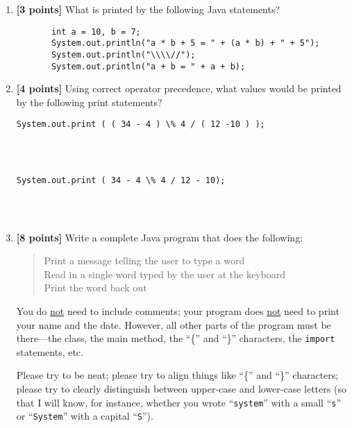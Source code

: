 \documentclass[11pt]{report}
\begin{document}
\begin{enumerate}
\bigskip

\item {\bf [3 points]}
What is printed by the following Java statements? 
\begin{verbatim}
       int a = 10, b = 7;
       System.out.println("a * b + 5 = " + (a * b) + " + 5");
       System.out.println("\\\\//");
       System.out.println("a + b = " + a + b);
\end{verbatim}

\vspace{1.0in}
\item {\bf [4 points]}
Using correct operator precedence, what values would be printed by the following
print statements?
\begin{verbatim}
System.out.print ( ( 34 - 4 ) \% 4 / ( 12 -10 ) );




\end{verbatim}
\begin{verbatim}
System.out.print ( 34 - 4 \% 4 / 12 - 10); 




\end{verbatim}

\item {\bf [8 points]}
Write a complete Java program that does the following: 
\begin{quote}
Print a message telling the user to type a word\\
Read in a single word typed by the user at the keyboard\\
Print the word back out
\end{quote}
You do \underline{not} need to include 
comments; your program does \underline{not} need to print your 
name and the date. However, all other parts of the program must be
there---the class, the main method, the ``\{'' and ``\}'' characters,
the {\tt import} statements, etc.

Please try to be neat; please try to align things like ``\{'' and ``\}''
characters; please try to clearly distinguish between upper-case and
lower-case letters (so that I will know, for instance, whether
you wrote ``{\tt system}'' with a small ``{\tt s}'' or ``{\tt System}''
with a capital ``{\tt S}'').

\vspace{3in}


\end{enumerate}
\end{document}
